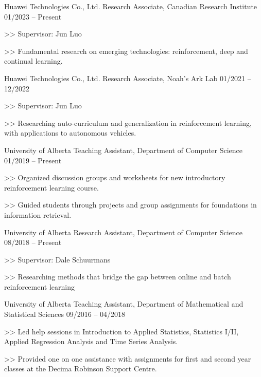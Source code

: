 \begin{cventries}
  \cventry
    {Huawei Technologies Co., Ltd.}
    {Research Associate, Canadian Research Institute}
    {01/2023 -- Present}
    {
      \begin{cvitems}
        \item[>>] Supervisor: Jun Luo
        \item[>>] Fundamental research on emerging technologies: reinforcement, deep and continual learning.
      \end{cvitems}
    }
  \cventry
    {Huawei Technologies Co., Ltd.}
    {Research Associate, Noah's Ark Lab}
    {01/2021 -- 12/2022}
    {
      \begin{cvitems}
        \item[>>] Supervisor: Jun Luo
        \item[>>] Researching auto-curriculum and generalization in
        reinforcement learning, with applications to autonomous vehicles.
      \end{cvitems}
    }

  \cventry
    {University of Alberta}
    {Teaching Assistant, Department of Computer Science}
    {01/2019 -- Present}
    {
      \begin{cvitems}
        \item[>>] Organized discussion groups and worksheets for new introductory reinforcement learning course.
        \item[>>] Guided students through projects and group assignments for foundations in information retrieval.
      \end{cvitems}
    }

  \cventry
    {University of Alberta}
    {Research Assistant, Department of Computer Science}
    {08/2018 -- Present}
    {
      \begin{cvitems}
      \item[>>] Supervisor: Dale Schuurmans 
      \item[>>] Researching methods that bridge the gap between online and batch
      reinforcement learning
      \end{cvitems}
    }

  \cventry
    {University of Alberta}
    {Teaching Assistant, Department of Mathematical and Statistical Sciences} {09/2016 -- 04/2018}
    {
      \begin{cvitems}
        \item[>>] Led help sessions in Introduction to Applied Statistics, Statistics I/II, Applied Regression Analysis and Time Series Analysis.
        \item[>>] Provided one on one assistance with assignments for first and second year classes at the Decima Robinson Support Centre.
      \end{cvitems}
    }


\end{cventries}
